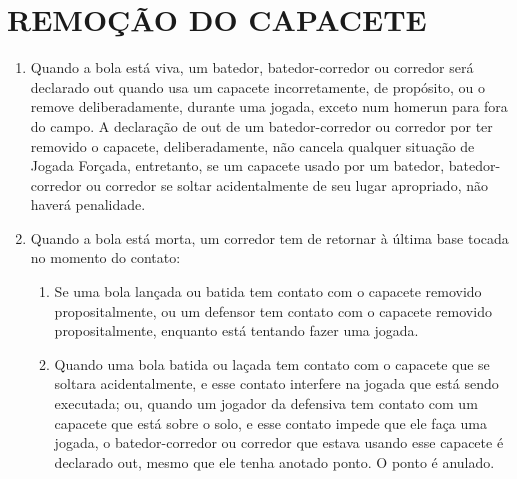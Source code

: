 \section{REMO\c{C}\~AO DO CAPACETE}
\begin{multicols}{2}
	\begin{enumerate}[label=\alph*)]
		\item Quando a bola est\'a viva, um batedor, batedor-corredor ou corredor ser\'a declarado \gls{out} quando usa um capacete incorretamente, de prop\'osito, ou o remove deliberadamente, durante uma jogada, exceto num \gls{homerun} para fora do campo. A declara\c{c}\~ao de \gls{out} de um batedor-corredor ou corredor por ter removido o capacete, deliberadamente, n\~ao cancela qualquer situa\c{c}\~ao de Jogada For\c{c}ada, entretanto, se um capacete usado por um batedor, batedor-corredor ou corredor se soltar acidentalmente de seu lugar apropriado, n\~ao haver\'a penalidade.
		
		\item Quando a bola est\'a morta, um corredor tem de retornar \`a \'ultima base tocada no momento do contato: 
		\begin{enumerate}[label=\roman*.]
			\item Se uma bola lan\c{c}ada ou batida tem contato com o capacete removido propositalmente, ou um defensor tem contato com o capacete removido propositalmente, enquanto est\'a tentando fazer uma jogada. 
			\item Quando uma bola batida ou la\c{c}ada tem contato com o capacete que se soltara acidentalmente, e esse contato interfere na jogada que est\'a sendo executada; ou, quando um jogador da defensiva tem contato com um capacete que est\'a sobre o solo, e esse contato impede que ele fa\c{c}a uma jogada, o batedor-corredor ou corredor que estava usando esse capacete \'e declarado \gls{out}, mesmo que ele tenha anotado ponto. O ponto \'e anulado. 
		\end{enumerate}
	\end{enumerate}
\end{multicols}

